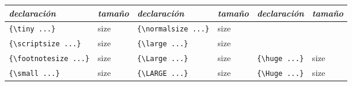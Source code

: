 \documentclass{article}
\begin{document}
\begin{tabular}{||l|l||l|l||l|l||} \hline
  \emph{declaración} & \emph{tamaño} & \emph{declaración} & \emph{tamaño} & \emph{declaración} & \emph{tamaño} \\ \hline
  \texttt{\{\textbackslash tiny ...\}} & \tiny size & \texttt{\{\textbackslash normalsize ...\}} & \normalsize size & & \\
  \texttt{\{\textbackslash scriptsize ...\}} & \scriptsize size & \texttt{\{\textbackslash large ...\}} & \large size & & \\
  \texttt{\{\textbackslash footnotesize ...\}} & \footnotesize size & \texttt{\{\textbackslash Large ...\}} & \Large size & \texttt{\{\textbackslash huge ...\}} & \huge size\\
  \texttt{\{\textbackslash small ...\}} & \small size & \texttt{\{\textbackslash LARGE ...\}} & \LARGE size & \texttt{\{\textbackslash Huge ...\}} & \Huge size \\ \hline
\end{tabular}
\end{document}
